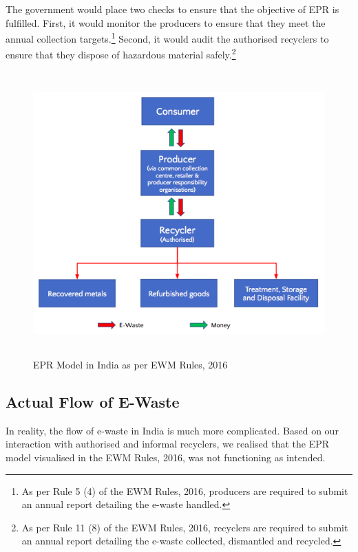 \documentclass[a4paper, 12pt]{article}
\begin{document}
                    The government would place two checks to ensure that the objective of EPR is fulfilled. First, it would monitor the producers to ensure that they meet the annual collection targets.\footnote{As per Rule 5 (4) of the EWM Rules, 2016, producers are required to submit an annual report detailing the e-waste handled.} Second, it would audit the authorised recyclers to ensure that they dispose of hazardous material safely.\footnote{As per Rule 11 (8) of the EWM Rules, 2016, recyclers are required to submit an annual report detailing the e-waste collected, dismantled and recycled.}\\
                    
                    \begin{figure}[H]
                    	\centering
                    	\includegraphics[height = 4.3in]{fig1.png}
                    	\caption[Optional Caption]{EPR Model in India as per EWM Rules, 2016}
                    \end{figure}
                    
                    \subsection{Actual Flow of E-Waste}
                    
                    In reality, the flow of e-waste in India is much more complicated. Based on our interaction with authorised and informal recyclers, we realised that the EPR model visualised in the EWM Rules, 2016, was not functioning as intended.\\ 
                    
\end{document}

